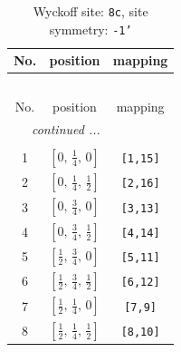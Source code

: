 \documentclass[fleqn,8pt]{jsarticle}
\begin{document}
\begin{longtable}{ccc}
\caption{Wyckoff site: {\tt 8c}, site symmetry: {\tt -1'}}
 \\
 \hline \hline
No. & position & mapping \\ \hline \endfirsthead

\multicolumn{2}{l}{\tablename\ \thetable{}} \\
 \hline \hline
No. & position & mapping \\ \hline \endhead

 \hline \hline
\multicolumn{2}{r}{\footnotesize\it continued ...} \\ \endfoot

 \hline \hline
\multicolumn{2}{r}{} \\ \endlastfoot

1 & $\left[ 0,\, \frac{1}{4},\, 0 \right]$ & {\tt [1,15]} \\ \hline
2 & $\left[ 0,\, \frac{1}{4},\, \frac{1}{2} \right]$ & {\tt [2,16]} \\ \hline
3 & $\left[ 0,\, \frac{3}{4},\, 0 \right]$ & {\tt [3,13]} \\ \hline
4 & $\left[ 0,\, \frac{3}{4},\, \frac{1}{2} \right]$ & {\tt [4,14]} \\ \hline
5 & $\left[ \frac{1}{2},\, \frac{3}{4},\, 0 \right]$ & {\tt [5,11]} \\ \hline
6 & $\left[ \frac{1}{2},\, \frac{3}{4},\, \frac{1}{2} \right]$ & {\tt [6,12]} \\ \hline
7 & $\left[ \frac{1}{2},\, \frac{1}{4},\, 0 \right]$ & {\tt [7,9]} \\ \hline
8 & $\left[ \frac{1}{2},\, \frac{1}{4},\, \frac{1}{2} \right]$ & {\tt [8,10]} \\
\end{longtable}
\renewcommand{\arraystretch}{1.2}
\end{document}
